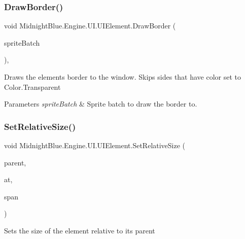 \subsubsection{\texorpdfstring{Draw\+Border()}{DrawBorder()}}
{\footnotesize\ttfamily void Midnight\+Blue.\+Engine.\+U\+I.\+U\+I\+Element.\+Draw\+Border (\begin{DoxyParamCaption}\item[{Sprite\+Batch}]{sprite\+Batch }\end{DoxyParamCaption})\hspace{0.3cm}{\ttfamily [inline]}, {\ttfamily [protected]}}



Draws the elements border to the window. Skips sides that have color set to Color.\+Transparent 


\begin{DoxyParams}{Parameters}
{\em sprite\+Batch} & Sprite batch to draw the border to.\\
\hline
\end{DoxyParams}
\hypertarget{class_midnight_blue_1_1_engine_1_1_u_i_1_1_u_i_element_ae111ac1d2f348f78f689a7619ac47853}{}\label{class_midnight_blue_1_1_engine_1_1_u_i_1_1_u_i_element_ae111ac1d2f348f78f689a7619ac47853} 
\subsubsection{\texorpdfstring{Set\+Relative\+Size()}{SetRelativeSize()}\hspace{0.1cm}{\footnotesize\ttfamily [1/2]}}
{\footnotesize\ttfamily void Midnight\+Blue.\+Engine.\+U\+I.\+U\+I\+Element.\+Set\+Relative\+Size (\begin{DoxyParamCaption}\item[{\hyperlink{class_midnight_blue_1_1_engine_1_1_u_i_1_1_u_i_content}{U\+I\+Content}}]{parent,  }\item[{Point}]{at,  }\item[{Point}]{span }\end{DoxyParamCaption})\hspace{0.3cm}{\ttfamily [inline]}}



Sets the size of the element relative to its parent 



